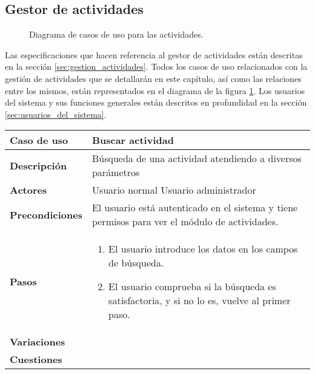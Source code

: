 \subsection{Gestor de actividades}

\begin{figure}
\centering
{}
\caption{Diagrama de casos de uso para las actividades.}
\label{fig:CU_actividades}
\end{figure}

Las especificaciones que hacen referencia al gestor de actividades están
descritas en la sección \ref{sec:gestion_actividades}. Todos los casos de uso
relacionados con la gestión de actividades que se detallarán en este capítulo,
así como las relaciones entre los mismos, están representados en el diagrama de
la figura \ref{fig:CU_actividades}. Los usuarios del sistema y sus funciones
generales están descritos en profundidad en la sección
\ref{sec:usuarios_del_sistema}.

\begin{tabular}{|p{1.25in}|p{3.65in}|}\hline
\textbf{Caso de uso} & \textbf{Buscar actividad}\\\hline\hline
\textbf{Descripción} & Búsqueda de una actividad atendiendo a diversos
parámetros\\\hline
\textbf{Actores} & Usuario normal \newline Usuario administrador\\\hline
\textbf{Precondiciones} & El usuario está autenticado en el sistema y
tiene permisos para ver el módulo de actividades. \\\hline
\textbf{Pasos} & 
  \begin{enumerate}
   \item El usuario introduce los datos en los campos de búsqueda.
   \item El usuario comprueba si la búsqueda es satisfactoria, y si no lo es,
vuelve al primer paso.
  \end{enumerate}
\\\hline
\textbf{Variaciones} & \\\hline
\textbf{Cuestiones} & \\\hline
\end{tabular}

